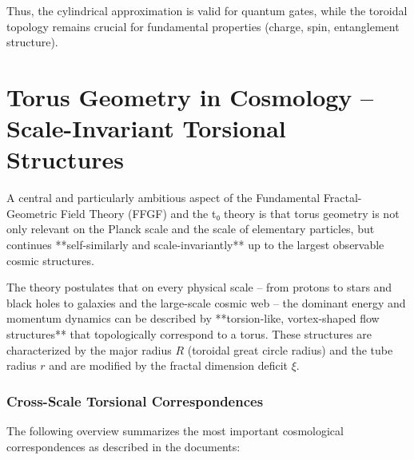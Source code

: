 Thus, the cylindrical approximation is valid for quantum gates, while 
the toroidal topology remains crucial for fundamental properties 
(charge, spin, entanglement structure).

\section{Torus Geometry in Cosmology – Scale-Invariant Torsional Structures}

A central and particularly ambitious aspect of the Fundamental Fractal-Geometric Field Theory (FFGF) and the t₀ theory is that torus geometry is not only relevant on the Planck scale and the scale of elementary particles, but continues **self-similarly and scale-invariantly** up to the largest observable cosmic structures.

The theory postulates that on every physical scale – from protons to stars and black holes to galaxies and the large-scale cosmic web – the dominant energy and momentum dynamics can be described by **torsion-like, vortex-shaped flow structures** that topologically correspond to a torus. These structures are characterized by the major radius $R$ (toroidal great circle radius) and the tube radius $r$ and are modified by the fractal dimension deficit $\xi$.

\subsubsection{Cross-Scale Torsional Correspondences}

The following overview summarizes the most important cosmological correspondences as described in the documents:

